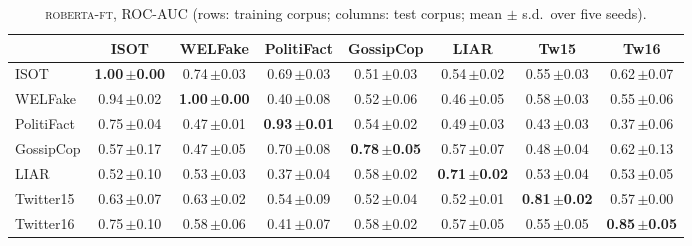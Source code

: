 \begin{table}[h]
\centering
\caption{\textsc{roberta-ft}, ROC-AUC (rows: training corpus; columns: test corpus; mean $\pm$ s.d.\ over five seeds).}
\scriptsize
\begin{tabular}{@{}lccccccc@{}}
\toprule
 & ISOT & WELFake & PolitiFact & GossipCop & LIAR & Tw15 & Tw16 \\
\midrule
ISOT & \textbf{1.00\,{\tiny$\pm$0.00}} & 0.74\,{\tiny$\pm$0.03} & 0.69\,{\tiny$\pm$0.03} & 0.51\,{\tiny$\pm$0.03} & 0.54\,{\tiny$\pm$0.02} & 0.55\,{\tiny$\pm$0.03} & 0.62\,{\tiny$\pm$0.07} \\
WELFake & 0.94\,{\tiny$\pm$0.02} & \textbf{1.00\,{\tiny$\pm$0.00}} & 0.40\,{\tiny$\pm$0.08} & 0.52\,{\tiny$\pm$0.06} & 0.46\,{\tiny$\pm$0.05} & 0.58\,{\tiny$\pm$0.03} & 0.55\,{\tiny$\pm$0.06} \\
PolitiFact & 0.75\,{\tiny$\pm$0.04} & 0.47\,{\tiny$\pm$0.01} & \textbf{0.93\,{\tiny$\pm$0.01}} & 0.54\,{\tiny$\pm$0.02} & 0.49\,{\tiny$\pm$0.03} & 0.43\,{\tiny$\pm$0.03} & 0.37\,{\tiny$\pm$0.06} \\
GossipCop & 0.57\,{\tiny$\pm$0.17} & 0.47\,{\tiny$\pm$0.05} & 0.70\,{\tiny$\pm$0.08} & \textbf{0.78\,{\tiny$\pm$0.05}} & 0.57\,{\tiny$\pm$0.07} & 0.48\,{\tiny$\pm$0.04} & 0.62\,{\tiny$\pm$0.13} \\
LIAR & 0.52\,{\tiny$\pm$0.10} & 0.53\,{\tiny$\pm$0.03} & 0.37\,{\tiny$\pm$0.04} & 0.58\,{\tiny$\pm$0.02} & \textbf{0.71\,{\tiny$\pm$0.02}} & 0.53\,{\tiny$\pm$0.04} & 0.53\,{\tiny$\pm$0.05} \\
Twitter15 & 0.63\,{\tiny$\pm$0.07} & 0.63\,{\tiny$\pm$0.02} & 0.54\,{\tiny$\pm$0.09} & 0.52\,{\tiny$\pm$0.04} & 0.52\,{\tiny$\pm$0.01} & \textbf{0.81\,{\tiny$\pm$0.02}} & 0.57\,{\tiny$\pm$0.00} \\
Twitter16 & 0.75\,{\tiny$\pm$0.10} & 0.58\,{\tiny$\pm$0.06} & 0.41\,{\tiny$\pm$0.07} & 0.58\,{\tiny$\pm$0.02} & 0.57\,{\tiny$\pm$0.05} & 0.55\,{\tiny$\pm$0.05} & \textbf{0.85\,{\tiny$\pm$0.05}} \\
\bottomrule
\end{tabular}
\end{table}

